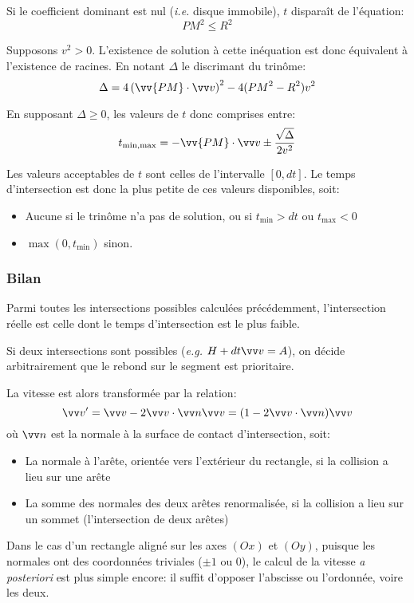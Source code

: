 \documentclass[a4paper]{article}
\begin{document}
Si le coefficient dominant est nul (\textit{i.e.} disque immobile),
$t$ disparaît de l'équation:
\[
  PM^2 \leq R^2
\]

Supposons $v^2 > 0$.
L'existence de solution à cette inéquation est donc équivalent à l'existence de racines.
En notant $\Delta$ le discrimant du trinôme:
\[
  \Delta = 4\left( \vv{PM} \cdot \vv v \right)^2 - 4 (PM^2 - R^2)v^2
\]

En supposant $\Delta \geq 0$, les valeurs de $t$ donc comprises entre:
\[
  t_{\text{min},\text{max}} = - \vv{PM}\cdot \vv v \pm \frac{\sqrt{\Delta}}{2v^2}
\]

Les valeurs acceptables de $t$ sont celles de l'intervalle $[0,dt]$.
Le temps d'intersection est donc la plus petite de ces valeurs disponibles, soit:
\begin{itemize}
  \item Aucune si le trinôme n'a pas de solution, ou si $t_\text{min} > dt$ ou $t_\text{max} < 0$
  \item $\max(0, t_\text{min})$ sinon.
\end{itemize}

\subsubsection{Bilan}
Parmi toutes les intersections possibles calculées précédemment,
l'intersection réelle est celle dont le temps d'intersection est le plus faible.

Si deux intersections sont possibles (\textit{e.g.} $H + dt\vv v = A$),
on décide arbitrairement que le rebond sur le segment est prioritaire.

La vitesse est alors transformée par la relation:
\[
  \vv v' = \vv v - 2 \vv v \cdot \vv n \vv v = (1-2\vv v \cdot \vv n) \vv v
\]
où $\vv n$ est la normale à la surface de contact d'intersection, soit:
\begin{itemize}
  \item La normale à l'arête, orientée vers l'extérieur du rectangle,
        si la collision a lieu sur une arête
  \item La somme des normales des deux arêtes renormalisée,
        si la collision a lieu sur un sommet (l'intersection de deux arêtes)
\end{itemize}
Dans le cas d'un rectangle aligné sur les axes $(Ox)$ et $(Oy)$,
puisque les normales ont des coordonnées triviales ($\pm 1$ ou $0$),
le calcul de la vitesse \textit{a posteriori} est plus simple encore:
il suffit d'opposer l'abscisse ou l'ordonnée, voire les deux.
\end{document}
